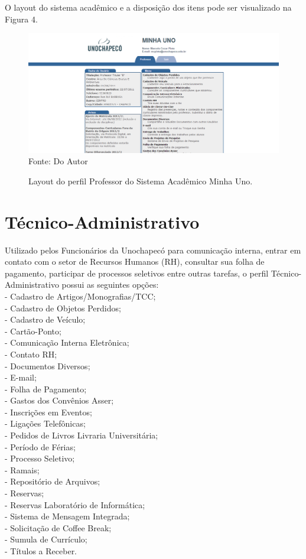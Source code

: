 O layout do sistema acadêmico e a disposição dos itens pode ser visualizado na Figura 4.


\begin{figure}[!htb]
     \centering
     \caption[Layout do Sistema - Perfil Professor]{Layout do perfil Professor do Sistema Acadêmico Minha Uno.}
     \includegraphics[scale=0.4]{imagens/professor.png}
     \\ Fonte: Do Autor
\end{figure}

\newpage

\section{Técnico-Administrativo}
Utilizado pelos Funcionários da Unochapecó para comunicação interna, entrar em contato com o setor de Recursos Humanos (RH),
consultar sua folha de pagamento, participar de processos seletivos entre outras tarefas, o perfil Técnico-Administrativo
possui as seguintes opções: \\
- Cadastro de Artigos/Monografias/TCC; \\
- Cadastro de Objetos Perdidos; \\
- Cadastro de Veículo; \\
- Cartão-Ponto; \\
- Comunicação Interna Eletrônica; \\
- Contato RH; \\
- Documentos Diversos; \\
- E-mail; \\
- Folha de Pagamento; \\
- Gastos dos Convênios Asser; \\
- Inscrições em Eventos; \\
- Ligações Telefônicas; \\
- Pedidos de Livros Livraria Universitária; \\
- Período de Férias; \\
- Processo Seletivo; \\
- Ramais; \\
- Repositório de Arquivos; \\
- Reservas; \\
- Reservas Laboratório de Informática; \\
- Sistema de Mensagem Integrada; \\
- Solicitação de Coffee Break; \\
- Sumula de Currículo; \\
- Títulos a Receber. \\

